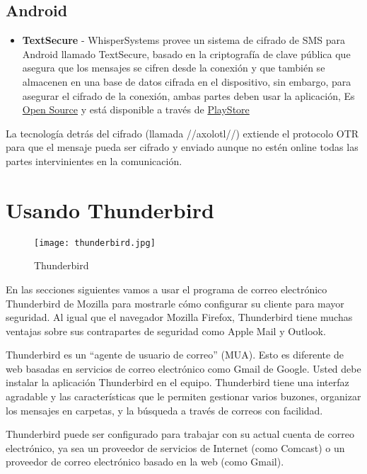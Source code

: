 \documentclass[10pt,a5paper,twoside,,]{book}
\providecommand{\tightlist}{%
  \setlength{\itemsep}{0pt}\setlength{\parskip}{0pt}}
\begin{document}
\section{Android}\label{android}

\begin{itemize}
\tightlist
\item
  \textbf{TextSecure} - WhisperSystems provee un sistema de cifrado de
  SMS para Android llamado TextSecure, basado en la criptografía de
  clave pública que asegura que los mensajes se cifren desde la conexión
  y que también se almacenen en una base de datos cifrada en el
  dispositivo, sin embargo, para asegurar el cifrado de la conexión,
  ambas partes deben usar la aplicación, Es
  \href{https://github.com/WhisperSystems/TextSecure/}{Open Source} y
  está disponible a través de
  \href{https://play.google.com/store/apps/details?id=org.thoughtcrime.securesms\&hl=en}{PlayStore}
\end{itemize}

La tecnología detrás del cifrado (llamada //axolotl//) extiende el
protocolo OTR para que el mensaje pueda ser cifrado y enviado aunque no
estén online todas las partes intervinientes en la comunicación.

\chapter{Usando Thunderbird}\label{usando-thunderbird}

\begin{figure}[htbp]
\centering
\texttt{[image: thunderbird.jpg]}
\caption{Thunderbird}
\end{figure}

En las secciones siguientes vamos a usar el programa de correo
electrónico Thunderbird de Mozilla para mostrarle cómo configurar su
cliente para mayor seguridad. Al igual que el navegador Mozilla Firefox,
Thunderbird tiene muchas ventajas sobre sus contrapartes de seguridad
como Apple Mail y Outlook.

Thunderbird es un ``agente de usuario de correo'' (MUA). Esto es
diferente de web basadas en servicios de correo electrónico como Gmail
de Google. Usted debe instalar la aplicación Thunderbird en el equipo.
Thunderbird tiene una interfaz agradable y las características que le
permiten gestionar varios buzones, organizar los mensajes en carpetas, y
la búsqueda a través de correos con facilidad.

Thunderbird puede ser configurado para trabajar con su actual cuenta de
correo electrónico, ya sea un proveedor de servicios de Internet (como
Comcast) o un proveedor de correo electrónico basado en la web (como
Gmail).
\end{document}
